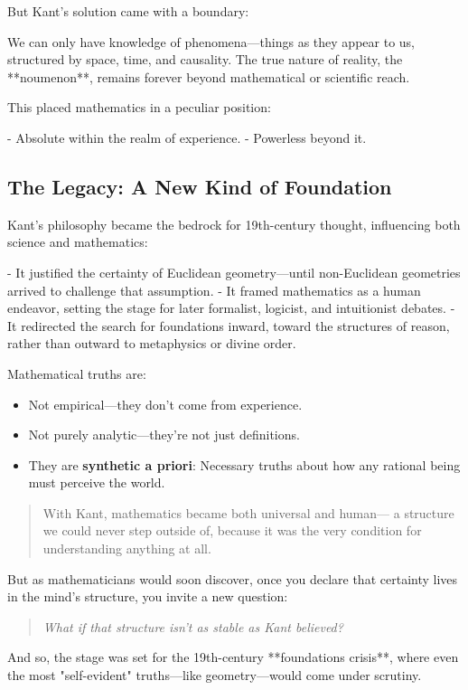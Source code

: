 But Kant’s solution came with a boundary:

We can only have knowledge of phenomena—things as they appear to us, structured by space, time, and causality. The true nature of reality, the **noumenon**, remains forever beyond mathematical or scientific reach.

This placed mathematics in a peculiar position:

- Absolute within the realm of experience.
- Powerless beyond it.

\subsection*{The Legacy: A New Kind of Foundation}

Kant’s philosophy became the bedrock for 19th-century thought, influencing both science and mathematics:

- It justified the certainty of Euclidean geometry—until non-Euclidean geometries arrived to challenge that assumption.
- It framed mathematics as a human endeavor, setting the stage for later formalist, logicist, and intuitionist debates.
- It redirected the search for foundations inward, toward the structures of reason, rather than outward to metaphysics or divine order.

\begin{tcolorbox}[colback=gray!5!white, colframe=black!75!white, title={Kant’s Foundation of Mathematics}]
Mathematical truths are:

\begin{itemize}
    \item Not empirical—they don’t come from experience.
    \item Not purely analytic—they’re not just definitions.
    \item They are \textbf{synthetic a priori}:  
    Necessary truths about how any rational being must perceive the world.
\end{itemize}
\end{tcolorbox}

\begin{quote}
With Kant, mathematics became both universal and human—  
a structure we could never step outside of, because it was the very condition for understanding anything at all.
\end{quote}

But as mathematicians would soon discover, once you declare that certainty lives in the mind’s structure, you invite a new question:

\begin{quote}
\textit{What if that structure isn’t as stable as Kant believed?}
\end{quote}

And so, the stage was set for the 19th-century **foundations crisis**, where even the most "self-evident" truths—like geometry—would come under scrutiny.
